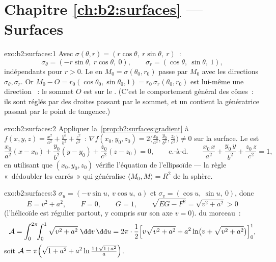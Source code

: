 \section*{Chapitre \ref{ch:b2:surfaces} --- Surfaces}

\begin{solution}{exo:b2:surfaces:1}
Avec $\sigma(\theta, r) = (r\cos\theta,\ r\sin\theta,\ r)$~:
\[
\sigma_\theta = (-r\sin\theta,\ r\cos\theta,\ 0),
\qquad
\sigma_r = (\cos\theta,\ \sin\theta,\ 1),
\]
indépendants pour $r > 0$. Le  en $M_0 =
\sigma(\theta_0, r_0)$ passe par $M_0$ avec les directions
$\sigma_\theta, \sigma_r$. Or $M_0 - O = r_0(\cos\theta_0,
\sin\theta_0, 1) = r_0\,\sigma_r(\theta_0, r_0)$ est lui-même une
direction ~: le sommet $O$ est sur le . (C'est
le comportement général des cônes~: ils sont réglés par des droites
passant par le sommet, et un  contient la génératrice
passant par le point de tangence.)
\end{solution}

\begin{solution}{exo:b2:surfaces:2}
Appliquer la~\cref{prop:b2:surfaces:gradient} à $f(x,y,z) =
\frac{x^2}{a^2} + \frac{y^2}{b^2} + \frac{z^2}{c^2}$~: $\nabla
f(x_0,y_0,z_0) = 2\bigl(\frac{x_0}{a^2}, \frac{y_0}{b^2},
\frac{z_0}{c^2}\bigr) \neq 0$ sur la surface. Le  est
\[
\frac{x_0}{a^2}(x - x_0) + \frac{y_0}{b^2}(y - y_0)
+ \frac{z_0}{c^2}(z - z_0) = 0,
\qquad\text{c.-à-d.}\qquad
\frac{x_0\,x}{a^2} + \frac{y_0\,y}{b^2} + \frac{z_0\,z}{c^2} = 1,
\]
en utilisant que $(x_0, y_0, z_0)$ vérifie l'équation de
l'ellipsoïde --- la règle «~dédoubler les carrés~» qui généralise
$\langle M_0, M \rangle = R^2$ de la sphère.
\end{solution}

\begin{solution}{exo:b2:surfaces:3}
$\sigma_u = (-v\sin u,\ v\cos u,\ a)$ et $\sigma_v = (\cos u,\
\sin u,\ 0)$, donc
\[
E = v^2 + a^2, \qquad F = 0, \qquad G = 1,
\qquad
\sqrt{EG - F^2} = \sqrt{v^2 + a^2} > 0
\]
(l'hélicoïde est régulier partout, y compris sur son axe $v =
0$).  du morceau~:
\[
\mathcal{A} = \int_0^{2\pi}\!\!\int_0^1
\sqrt{v^2 + a^2}\;\dd v\,\dd u
= 2\pi\cdot\frac12\Bigl[v\sqrt{v^2 + a^2}
+ a^2\ln\bigl(v + \sqrt{v^2 + a^2}\bigr)\Bigr]_0^1 ,
\]
soit $\mathcal{A} = \pi\Bigl(\sqrt{1 + a^2} +
a^2\ln\frac{1 + \sqrt{1 + a^2}}{a}\Bigr)$.
\end{solution}

